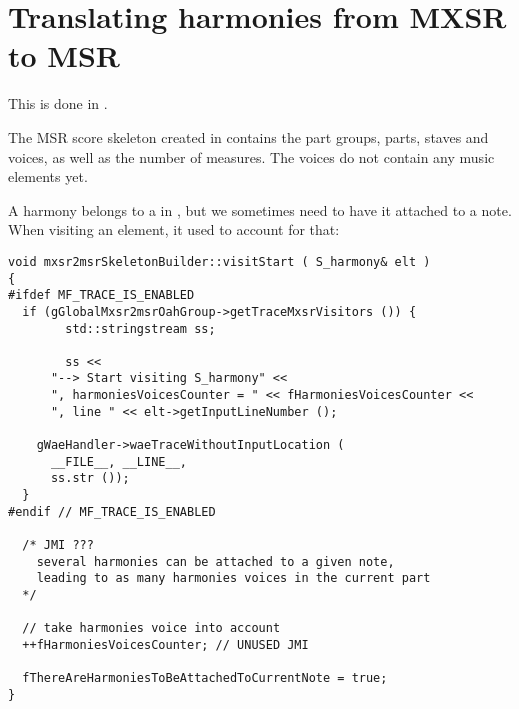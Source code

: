 \section{Translating harmonies from MXSR to MSR}

This is done in \mxsrToMsr{}.

The MSR score skeleton created in  contains the part groups, parts, staves and voices, as well as the number of measures. The voices do not contain any music elements yet.

A harmony belongs to a  in \mxml, but we sometimes need to have it attached to a note. When visiting an  element,  it used to account for that:%
\begin{lstlisting}[language=CPlusPlus]
void mxsr2msrSkeletonBuilder::visitStart ( S_harmony& elt )
{
#ifdef MF_TRACE_IS_ENABLED
  if (gGlobalMxsr2msrOahGroup->getTraceMxsrVisitors ()) {
		std::stringstream ss;

		ss <<
      "--> Start visiting S_harmony" <<
      ", harmoniesVoicesCounter = " << fHarmoniesVoicesCounter <<
      ", line " << elt->getInputLineNumber ();

    gWaeHandler->waeTraceWithoutInputLocation (
      __FILE__, __LINE__,
      ss.str ());
  }
#endif // MF_TRACE_IS_ENABLED

  /* JMI ???
    several harmonies can be attached to a given note,
    leading to as many harmonies voices in the current part
  */

  // take harmonies voice into account
  ++fHarmoniesVoicesCounter; // UNUSED JMI

  fThereAreHarmoniesToBeAttachedToCurrentNote = true;
}
\end{lstlisting}

